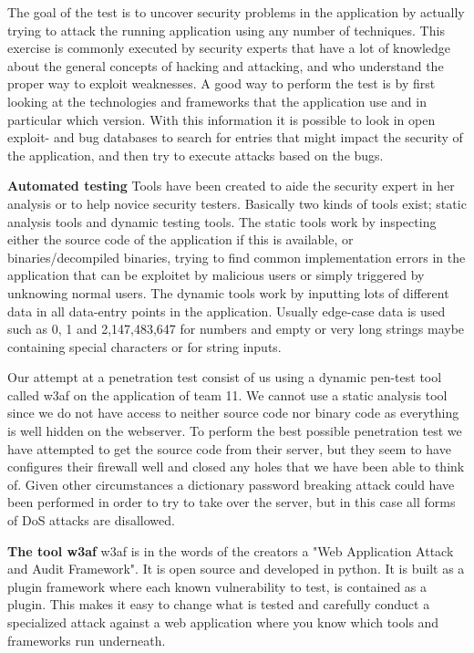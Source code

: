\documentclass[a4paper]{article}
\begin{document}
The goal of the test is to uncover security problems in the application by actually trying to attack the running application using any number of techniques. This exercise is commonly executed by security experts that have a lot of knowledge about the general concepts of hacking and attacking, and who understand the proper way to exploit weaknesses. 
A good way to perform the test is by first looking at the technologies and frameworks that the application use and in particular which version. With this information it is possible to look in open exploit- and bug databases to search for entries that might impact the security of the application, and then try to execute attacks based on the bugs.

\textbf{Automated testing}
Tools have been created to aide the security expert in her analysis or to help novice security testers. Basically two kinds of tools exist; static analysis tools and dynamic testing tools.
The static tools work by inspecting either the source code of the application if this is available, or binaries/decompiled binaries, trying to find common implementation errors in the application that can be exploitet by malicious users or simply triggered by unknowing normal users.
The dynamic tools work by inputting lots of different data in all data-entry points in the application. Usually edge-case data is used such as 0, 1 and 2,147,483,647 for numbers and empty or very long strings maybe containing special characters or for string inputs.

Our attempt at a penetration test consist of us using a dynamic pen-test tool called w3af on the application of team 11.
We cannot use a static analysis tool since we do not have access to neither source code nor binary code as everything is well hidden on the webserver. To perform the best possible penetration test we have attempted to get the source code from their server, but they seem to have configures their firewall well and closed any holes that we have been able to think of. Given other circumstances a dictionary password breaking attack could have been performed in order to try to take over the server, but in this case all forms of DoS attacks are disallowed.

\textbf{The tool w3af}
w3af is in the words of the creators a "Web Application Attack and Audit Framework". It is open source and developed in python. It is built as a plugin framework where each known vulnerability to test, is contained as a plugin. This makes it easy to change what is tested and carefully conduct a specialized attack against a web application where you know which tools and frameworks run underneath.
\end{document}
